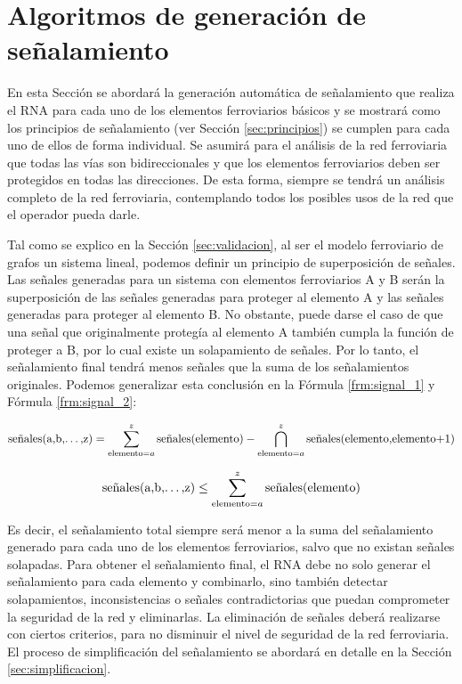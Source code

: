 \section{Algoritmos de generación de señalamiento}
    \label{sec:generacion}
    
    En esta Sección se abordará la generación automática de señalamiento que realiza el RNA para cada uno de los elementos ferroviarios básicos y se mostrará como los principios de señalamiento (ver Sección \ref{sec:principios}) se cumplen para cada uno de ellos de forma individual. Se asumirá para el análisis de la red ferroviaria que todas las vías son bidireccionales y que los elementos ferroviarios deben ser protegidos en todas las direcciones. De esta forma, siempre se tendrá un análisis completo de la red ferroviaria, contemplando todos los posibles usos de la red que el operador pueda darle.
    
    Tal como se explico en la Sección \ref{sec:validacion}, al ser el modelo ferroviario de grafos un sistema lineal, podemos definir un principio de superposición de señales. Las señales generadas para un sistema con elementos ferroviarios A y B serán la superposición de las señales generadas para proteger al elemento A y las señales generadas para proteger al elemento B. No obstante, puede darse el caso de que una señal que originalmente protegía al elemento A también cumpla la función de proteger a B, por lo cual existe un solapamiento de señales. Por lo tanto, el señalamiento final tendrá menos señales que la suma de los señalamientos originales. Podemos generalizar esta conclusión en la Fórmula \ref{frm:signal_1} y Fórmula \ref{frm:signal_2}:

    \begin{equation}
    \text{señales(a,b,\dots,z)} = \sum_{\text{elemento}=a}^{z} \text{señales(elemento)} - \displaystyle\bigcap_{\text{elemento}=a}^{z} \text{señales(elemento,elemento+1)} 
    \label{frm:signal_1}
    \end{equation}

    \begin{equation}
    \text{señales(a,b,\dots,z)} \leq \sum_{\text{elemento}=a}^{z} \text{señales(elemento)} 
    \label{frm:signal_2}
    \end{equation}

    Es decir, el señalamiento total siempre será menor a la suma del señalamiento generado para cada uno de los elementos ferroviarios, salvo que no existan señales solapadas. Para obtener el señalamiento final, el RNA debe no solo generar el señalamiento para cada elemento y combinarlo, sino también detectar solapamientos, inconsistencias o señales contradictorias que puedan comprometer la seguridad de la red y eliminarlas. La eliminación de señales deberá realizarse con ciertos criterios, para no disminuir el nivel de seguridad de la red ferroviaria. El proceso de simplificación del señalamiento se abordará en detalle en la Sección \ref{sec:simplificacion}.

    
    
    
    
    
    
    
